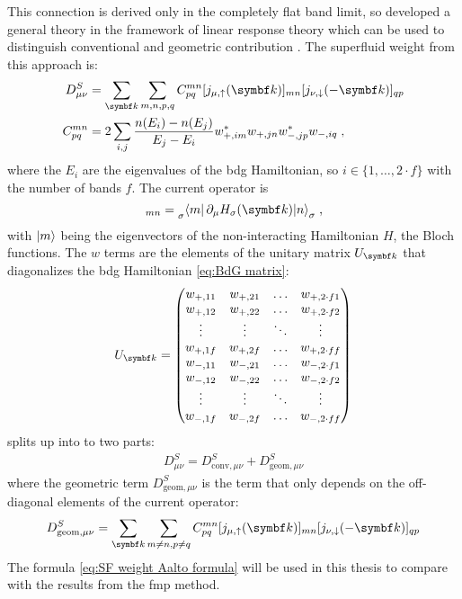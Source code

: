 \documentclass[../main.tex]{subfiles}
\begin{document}
This connection is derived only in the completely flat band limit, so \citeauthor{liangBandGeometryBerry2017} developed a general theory in the framework of linear response theory which can be used to distinguish conventional and geometric contribution \cite{liangBandGeometryBerry2017}.
The superfluid weight from this approach is:
\begin{align}
	D^S_{\mu \nu} &= \sum_{\vb{k}} \sum_{m, n, p, q} C_{pq}^{mn} [j_{\mu, \uparrow} (\vb{k})]_{mn} [j_{\nu, \downarrow} (-\vb{k})]_{qp} \label{eq:SF weight Aalto formula} \\
	C_{pq}^{mn} &= 2 \sum_{i, j} \frac{n(E_i) - n(E_j)}{E_j - E_i} w_{+, im}^* w_{+, jn} w_{-, jp}^* w_{-, iq}\;,
\end{align}
where the \(E_i\) are the eigenvalues of the \gls{bdg} Hamiltonian, so \(i \in \{1, \ldots, 2 \cdot f\}\) with the number of bands \(f\).
The current operator is
\begin{equation}
	[j_{\mu, \sigma} (\vb{k})]_{mn} = \prescript{}{\sigma}{\braket{m \vert \pdif{\mu} H_{\sigma} (\vb{k}) \vert n}_{\sigma}}\;,
\end{equation}
with \(\ket{m}\) being the eigenvectors of the non-interacting Hamiltonian \(H\), the Bloch functions.
The \(w\) terms are the elements of the unitary matrix \(U_{\vb{k}}\) that diagonalizes the \gls{bdg} Hamiltonian \cref{eq:BdG matrix}:
\begin{equation}
	U_{\vb{k}} = \begin{pmatrix}
		w_{+, 11} & w_{+, 21} &\ldots & w_{+, 2\cdot f 1} \\
		w_{+, 12} & w_{+, 22} &\ldots & w_{+, 2\cdot f 2} \\
		\vdots    & \vdots    &\ddots & \vdots \\
		w_{+, 1f} & w_{+, 2f} &\ldots & w_{+, 2\cdot f f} \\
		w_{-, 11} & w_{-, 21} &\ldots & w_{-, 2\cdot f 1} \\
		w_{-, 12} & w_{-, 22} &\ldots & w_{-, 2\cdot f 2} \\
		\vdots    & \vdots    &\ddots & \vdots \\
		w_{-, 1f} & w_{-, 2f} &\ldots & w_{-, 2\cdot f f}
	\end{pmatrix}
\end{equation}
 splits up into to two parts:
\begin{align}
	D^S_{\mu \nu} = D^S_{\mathrm{conv}, \mu \nu} + D^S_{\mathrm{geom}, \mu \nu}
\end{align}
where the geometric term \(D^S_{\mathrm{geom}, \mu \nu}\) is the term that only depends on the off-diagonal elements of the current operator:
\begin{equation}
	D^S_{\mathrm{geom}, \mu \nu} = \sum_{\vb{k}} \sum_{m \neq n, p \neq q} C_{pq}^{mn} [j_{\mu, \uparrow} (\vb{k})]_{mn} [j_{\nu, \downarrow} (-\vb{k})]_{qp}
\end{equation}
The formula \cref{eq:SF weight Aalto formula}  will be used in this thesis to compare with the results from the \gls{fmp} method.
\end{document}

